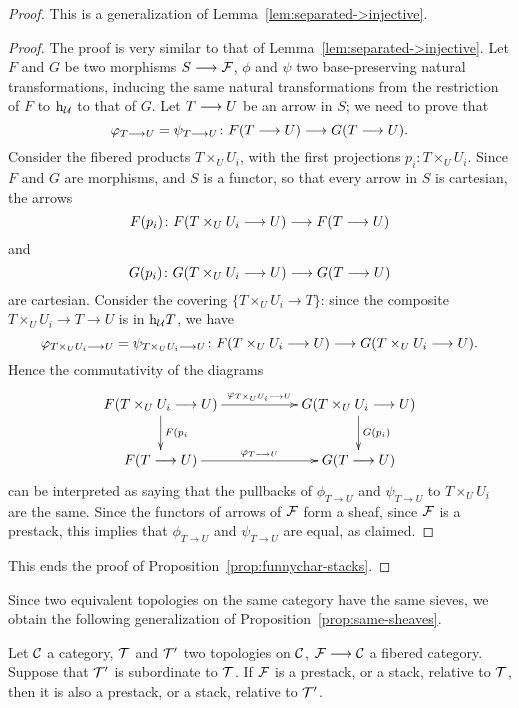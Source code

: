 \begin{4   STACKS}
\begin{4.1 Descent of objects of fibcats}
\begin{proof}
This is a generalization of Lemma~\ref{lem:separated->injective}.

\begin{proof}
The proof is very similar to that of Lemma~\ref{lem:separated->injective}. Let $F$ and $G$ be two morphisms $S \arr \cF$, $\phi$ and $\psi$ two base-preserving natural transformations, inducing the same natural transformations from the restriction of $F$ to $\mathrm{h}_{\mathcal{U}}$ to that of $G$. Let $T \arr U$ be an arrow in $S$; we need to prove that
   \[
   \phi_{T \to U} = \psi_{T \to U} \colon F(T \to U) \arr G(T \to U).
   \]
Consider the fibered products $T \times_{U} U_{i}$, with the first projections $p_{i} \colon T \times_{U} U_{i}$. Since $F$ and $G$ are morphisms, and $S$ is a functor, so that every arrow in $S$ is cartesian, the arrows
   \[
   F(p_{i}) \colon F(T \times_{U} U_{i} \to U) \arr F(T \to U)
   \]
and
   \[
   G(p_{i}) \colon G(T \times_{U} U_{i} \to U) \arr G(T \to U)
   \]
are cartesian. Consider the covering $\{T \times_{U} U_{i} \to T\}$: since the composite $T \times_{U} U_{i} \to T \to U$ is in $\mathrm{h}_{\mathcal{U}}T$, we have
   \[
   \phi_{T \times_{U} U_{i} \to U} = \psi_{T \times_{U} U_{i} \to U} \colon 
      F(T \times_{U} U_{i} \to U) \arr G(T \times_{U} U_{i} \to U).
   \]
Hence the commutativity of the diagrams
   \[
   \xymatrix{
   F(T \times_{U} U_{i} \to U) \ar[rr]^-{\phi_{T \times_{U} U_{i} \to U}}
         \ar[d]^{F(p_{i}}
      && G(T \times_{U} U_{i} \to U) \ar[d]^{G(p_{i})}\\
   F(T \to U) \ar[rr]^-{\phi_{T \to U}} &&
      G(T \to U)
   }
   \]
can be interpreted as saying that the pullbacks of $\phi_{T\to U}$ and $\psi_{T\to U}$ to $T \times_{U}U_{i}$ are the same. Since the functors of arrows of $\mathcal{F}$ form a sheaf, since $\mathcal{F}$ is a prestack, this implies that $\phi_{T\to U}$ and $\psi_{T\to U}$ are equal, as claimed.
\end{proof}

This ends the proof of Proposition~\ref{prop:funnychar-stacks}.
\end{proof}

Since two equivalent topologies on the same category have the same sieves, we obtain the following generalization of Proposition~\ref{prop:same-sheaves}.


\begin{proposition}\label{prop:same-stacks}
Let $\mathcal{C}$ a category, $\mathcal{T}$ and $\mathcal{T}'$ two topologies on $\mathcal{C}$, $\cF \arr \cC$ a fibered category. Suppose that $\mathcal{T}'$ is subordinate to $\mathcal{T}$. If $\mathcal{F}$ is a prestack, or a stack, relative to $\mathcal{T}$, then it is also a prestack, or a stack, relative to $\mathcal{T}'$.
\end{proposition}


\end{4.1 Descent of objects of fibcats}
\end{4   STACKS}
